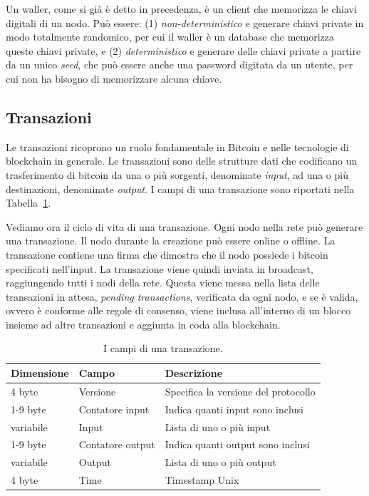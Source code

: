 Un waller, come si già è detto in precedenza, è un client che memorizza le chiavi digitali di un nodo. Può essere: (1) \emph{non-deterministico} e generare chiavi private in modo totalmente randomico, per cui il waller è un database che memorizza queste chiavi private, e (2) \emph{deterministico} e generare delle chiavi private a partire da un unico \emph{seed}, che può essere anche una password digitata da un utente, per cui non ha bisogno di memorizzare alcuna chiave.


\subsection{Transazioni}

Le transazioni ricoprono un ruolo fondamentale in Bitcoin e nelle tecnologie di blockchain in generale. Le transazioni sono delle strutture dati che codificano un trasferimento di bitcoin da una o più sorgenti, denominate \emph{input}, ad una o più destinazioni, denominate \emph{output}. I campi di una transazione sono riportati nella Tabella~\ref{tab:tx_fields}.

Vediamo ora il ciclo di vita di una transazione. Ogni nodo nella rete può generare una transazione. Il nodo durante la creazione può essere online o offline. La transazione contiene una firma che dimostra che il nodo possiede i bitcoin specificati nell'input. La transazione viene quindi inviata in broadcast, raggiungendo tutti i nodi della rete. Questa viene messa nella lista delle transazioni in attesa, \emph{pending transactions}, verificata da ogni nodo, e se è valida, ovvero è conforme alle regole di consenso, viene inclusa all'interno di un blocco insieme ad altre transazioni e aggiunta in coda alla blockchain.

\begin{table}
	\centering
	\begin{tabular}{lll}
		\toprule
		Dimensione&Campo&Descrizione\\
		\midrule
		4 byte&Versione&Specifica la versione del protocollo\\
		1-9 byte&Contatore input&Indica quanti input sono inclusi\\
		variabile&Input&Lista di uno o più input\\
		1-9 byte&Contatore output&Indica quanti output sono inclusi\\
		variabile&Output&Lista di uno o più output\\
		4 byte&Time&Timestamp Unix\\
		\bottomrule
	\end{tabular}
	\caption{I campi di una transazione.}
	\label{tab:tx_fields}
\end{table}

